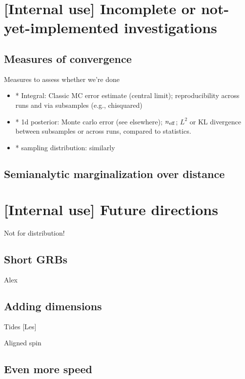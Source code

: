 \section{[Internal use] Incomplete or not-yet-implemented investigations}

\subsection{Measures of convergence}

Measures to assess whether we're done
\begin{itemize}
\item * Integral: Classic MC error estimate (central limit); reproducibility across runs and via subsamples (e.g., chisquared)

\item * 1d posterior:  Monte carlo error (see elsewhere); $n_{\rm eff}$; $L^2$ or KL divergence between subsamples or
  across runs, compared to statistics.

\item * sampling distribution: similarly
\end{itemize}


\subsection{Semianalytic marginalization over distance}


\section{[Internal use] Future directions}

Not for distribution!

\subsection{Short GRBs}

Alex

\subsection{Adding dimensions}

Tides [Les]

Aligned spin

\subsection{Even more speed}


